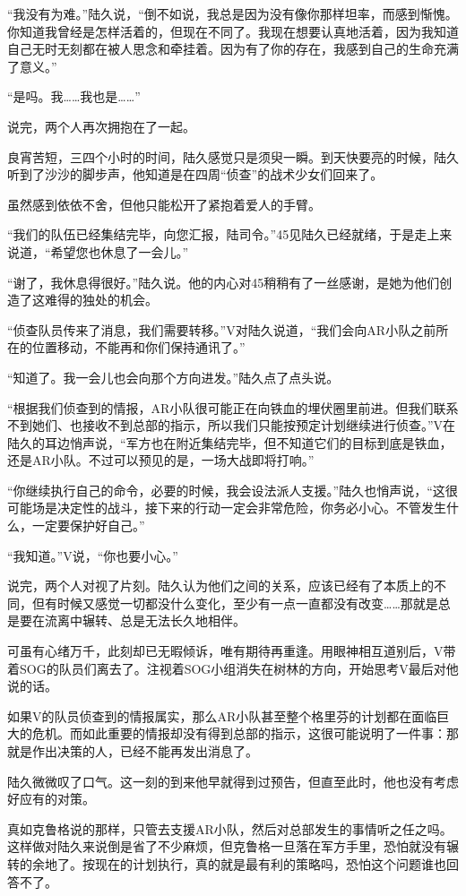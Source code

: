 “我没有为难。”陆久说，“倒不如说，我总是因为没有像你那样坦率，而感到惭愧。你知道我曾经是怎样活着的，但现在不同了。我现在想要认真地活着，因为我知道自己无时无刻都在被人思念和牵挂着。因为有了你的存在，我感到自己的生命充满了意义。”

“是吗。我……我也是……”

说完，两个人再次拥抱在了一起。

良宵苦短，三四个小时的时间，陆久感觉只是须臾一瞬。到天快要亮的时候，陆久听到了沙沙的脚步声，他知道是在四周“侦查”的战术少女们回来了。

虽然感到依依不舍，但他只能松开了紧抱着爱人的手臂。

“我们的队伍已经集结完毕，向您汇报，陆司令。”45见陆久已经就绪，于是走上来说道，“希望您也休息了一会儿。”

“谢了，我休息得很好。”陆久说。他的内心对45稍稍有了一丝感谢，是她为他们创造了这难得的独处的机会。

“侦查队员传来了消息，我们需要转移。”V对陆久说道，“我们会向AR小队之前所在的位置移动，不能再和你们保持通讯了。”

“知道了。我一会儿也会向那个方向进发。”陆久点了点头说。

“根据我们侦查到的情报，AR小队很可能正在向铁血的埋伏圈里前进。但我们联系不到她们、也接收不到总部的指示，所以我们只能按预定计划继续进行侦查。”V在陆久的耳边悄声说，“军方也在附近集结完毕，但不知道它们的目标到底是铁血，还是AR小队。不过可以预见的是，一场大战即将打响。”

“你继续执行自己的命令，必要的时候，我会设法派人支援。”陆久也悄声说，“这很可能场是决定性的战斗，接下来的行动一定会非常危险，你务必小心。不管发生什么，一定要保护好自己。”

“我知道。”V说，“你也要小心。”

说完，两个人对视了片刻。陆久认为他们之间的关系，应该已经有了本质上的不同，但有时候又感觉一切都没什么变化，至少有一点一直都没有改变……那就是总是要在流离中辗转、总是无法长久地相伴。

可虽有心绪万千，此刻却已无暇倾诉，唯有期待再重逢。用眼神相互道别后，V带着SOG的队员们离去了。注视着SOG小组消失在树林的方向，开始思考V最后对他说的话。

如果V的队员侦查到的情报属实，那么AR小队甚至整个格里芬的计划都在面临巨大的危机。而如此重要的情报却没有得到总部的指示，这很可能说明了一件事：那就是作出决策的人，已经不能再发出消息了。

陆久微微叹了口气。这一刻的到来他早就得到过预告，但直至此时，他也没有考虑好应有的对策。

真如克鲁格说的那样，只管去支援AR小队，然后对总部发生的事情听之任之吗。这样做对陆久来说倒是省了不少麻烦，但克鲁格一旦落在军方手里，恐怕就没有辗转的余地了。按现在的计划执行，真的就是最有利的策略吗，恐怕这个问题谁也回答不了。

